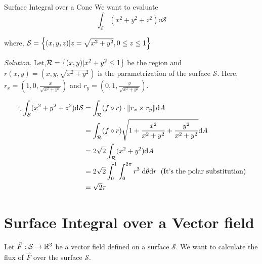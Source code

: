 \documentclass[../Analysis-3]{subfiles}
\begin{document}
\begin{Eg}{Surface Integral over a Cone}{}
    We want to evaluate \[ \int_{\mathcal{S}}(x^2+y^2+z^2) \dd \mathcal{S}\]

    where, $\mathcal{S} = \qty{(x,y,z) | z = \sqrt{x^2 + y^2},0 \le z \le 1}$

    \textit{Solution.} Let,$\mathcal{R} = \qty{(x,y)| x^2+y^2 \le 1}$ be the region and $r(x,y) = \left( x,y,\sqrt{x^2+y^2} \right)$ is the parametrization of the surface $\mathcal{S}$. Here, $r_x = \left( 1,0, \frac{x}{\sqrt{x^2+y^2}} \right)$ and $r_y = \left( 0,1,\frac{y}{\sqrt{x^2+y^2}} \right)$.


    \begin{align*}
        \therefore \int_{\mathcal{S}}(x^2+y^2+z^2) \dd \mathcal{S}
         & = \int_{\mathcal{R}} (f\circ r) \cdot \norm{r_x \times r_y} \dd A                                                                \\
         & = \int_{\mathcal{R}} (f\circ r) \sqrt{1 + \frac{x^2}{x^2+y^2} + \frac{y^2}{x^2+y^2}} \dd A                                       \\
         & = 2\sqrt{2} \int_{\mathcal{R}} (x^2+y^2) \dd A                                                                                   \\
         & = 2\sqrt{2} \int_{0}^{1} \int_{0}^{2\pi} r^3 \hspace{0.1cm} \dd \theta \dd r \hspace{0.2cm} (\text{It's the polar substitution}) \\
         & = \sqrt{2} \pi
    \end{align*}

\end{Eg}

\section{Surface Integral over a Vector field}

Let $\vec{F} : \mathcal{S} \to \mathbb{R}^3$ be a vector field defined on a surface $\mathcal{S}$. We want to calculate the flux of $\vec{F}$ over the surface $\mathcal{S}$.
\end{document}
